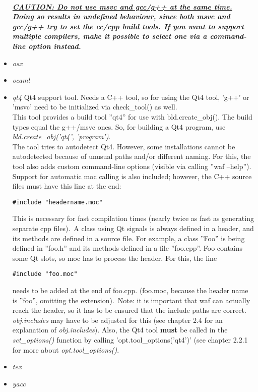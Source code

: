 \documentclass[a4,10pt]{article}
\begin{document}
\begin{itemize}
\\
		\emph{\textbf{\underline{CAUTION: Do not use msvc and gcc/g++ at the same time.} Doing so results in undefined behaviour, since both msvc and gcc/g++ try to set the cc/cpp build tools. If you want to support multiple compilers, make it possible to select one via a command-line option instead.}}
	\item \emph{osx}
	\item \emph{ocaml}
	\item \emph{qt4}
		Qt4 support tool. Needs a C++ tool, so for using the Qt4 tool, 'g++' or 'msvc' need to be initialized via check\_tool() as well.\\
		This tool provides a build tool ''qt4'' for use with bld.create\_obj(). The build types equal the g++/msvc ones. So, for building a Qt4 program, use \emph{bld.create\_obj('qt4', 'program')}.
		\\
		The tool tries to autodetect Qt4. However, some installations cannot be autodetected because of unusual paths and/or different naming. For this, the tool also adds custom command-line options (visible via calling ''waf --help''). Support for automatic moc calling is also included; however, the C++ source files must have this line at the end: \begin{verbatim}#include "headername.moc"\end{verbatim} This is necessary for fast compilation times (nearly twice as fast as generating separate cpp files).\
		A class using Qt signals is always defined in a header, and its methods are defined in a source file. For example, a class ''Foo'' is being defined in ''foo.h'' and its methods defined in a file ''foo.cpp''. Foo contains some Qt slots, so moc has to process the header. For this, the line \begin{verbatim}#include "foo.moc"\end{verbatim} needs to be added at the end of foo.cpp. (foo.moc, because the header name is ''foo'', omitting the extension).\
		Note: it is important that waf can actually reach the header, so it has to be ensured that the include paths are correct. \emph{obj.includes} may have to be adjusted for this (see chapter 2.4 for an explanation of \emph{obj.includes}). Also, the Qt4 tool \textbf{must} be called in the \emph{set\_options()} function by calling 'opt.tool\_options('qt4')' (see chapter 2.2.1 for more about \emph{opt.tool\_options()}.
	\item \emph{tex}
	\item \emph{yacc}
\end{itemize}
\end{document}
